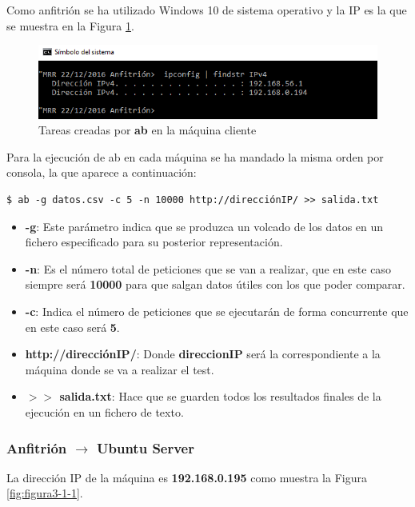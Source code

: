 Como anfitrión se ha utilizado Windows 10 de sistema operativo y la IP es la que se muestra en la Figura \ref{fig:anfitrion}.
\begin{figure}[H] %
	\centering
	\includegraphics[scale=0.7]{figuras/ejercicio3/anfitrion.png} 
	\caption{Tareas creadas por \textbf{ab} en la máquina cliente} 
	\label{fig:anfitrion}
\end{figure}

Para la ejecución de ab en cada máquina se ha mandado la misma orden por consola, la que aparece a continuación:
\begin{lstlisting}[style=fich]
$ ab -g datos.csv -c 5 -n 10000 http://direcciónIP/ >> salida.txt
\end{lstlisting}
\vspace{-22pt}

\begin{itemize}
	\item \textbf{-g}: Este parámetro indica que se produzca un volcado de los datos en un fichero especificado para su posterior representación.
	\item \textbf{-n}: Es el número total de peticiones que se van a realizar, que en este caso siempre será \textbf{10000} para que salgan datos útiles con los que poder comparar.
	\item \textbf{-c}: Indica el número de peticiones que se ejecutarán de forma concurrente que en este caso será \textbf{5}.
	\item \textbf{http://direcciónIP/}: Donde \textbf{direccionIP} será la correspondiente a la máquina donde se va a realizar el test.
	\item \textbf{$ >> $ salida.txt}: Hace que se guarden todos los resultados finales de la ejecución en un fichero de texto.
\end{itemize}

\subsubsection{Anfitrión $ \rightarrow $ Ubuntu Server }
La dirección IP de la máquina es \textbf{192.168.0.195} como muestra la Figura \ref{fig:figura3-1-1}.

